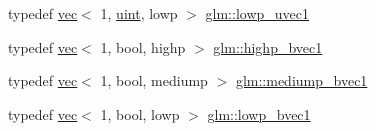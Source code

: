 \begin{DoxyCompactItemize}
\item 
typedef \hyperlink{structglm_1_1vec}{vec}$<$ 1, \hyperlink{group__core__precision_ga4fd29415871152bfb5abd588334147c8}{uint}, lowp $>$ \hyperlink{group__ext__vec1_gaa8d9fb78600ac97161b79c2e83f5a30f}{glm\+::lowp\+\_\+uvec1}
\item 
typedef \hyperlink{structglm_1_1vec}{vec}$<$ 1, bool, highp $>$ \hyperlink{group__ext__vec1_gac7fdd0536d878f87393132b3a7f9ef03}{glm\+::highp\+\_\+bvec1}
\item 
typedef \hyperlink{structglm_1_1vec}{vec}$<$ 1, bool, mediump $>$ \hyperlink{group__ext__vec1_ga1e19a89e380de140b1496a824d306155}{glm\+::mediump\+\_\+bvec1}
\item 
typedef \hyperlink{structglm_1_1vec}{vec}$<$ 1, bool, lowp $>$ \hyperlink{group__ext__vec1_ga861bf958322f2909514b1256be428490}{glm\+::lowp\+\_\+bvec1}
\end{DoxyCompactItemize}
